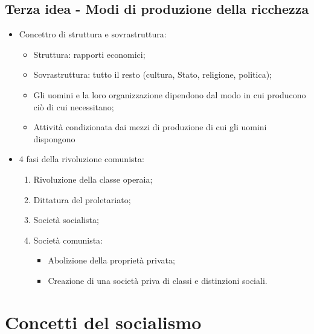 \documentclass{article}
\begin{document}
\subsection{Terza idea - Modi di produzione della ricchezza}
\begin{itemize}
    \item Concettro di struttura e sovrastruttura:
        \begin{itemize}
            \item Struttura: rapporti economici;
            \item Sovrastruttura: tutto il resto (cultura, Stato, religione, politica);
            \item Gli uomini e la loro organizzazione dipendono dal modo in cui producono ciò
                di cui necessitano;
            \item Attività condizionata dai mezzi di produzione di cui gli uomini dispongono
        \end{itemize}
    \item 4 fasi della rivoluzione comunista:
        \begin{enumerate}
            \item Rivoluzione della classe operaia;
            \item Dittatura del proletariato;
            \item Società socialista;
            \item Società comunista:
                \begin{itemize}
                    \item Abolizione della proprietà privata;
                    \item Creazione di una società priva di classi e distinzioni sociali.
                \end{itemize}
        \end{enumerate}
\end{itemize}

\section{Concetti del socialismo}
\end{document}

